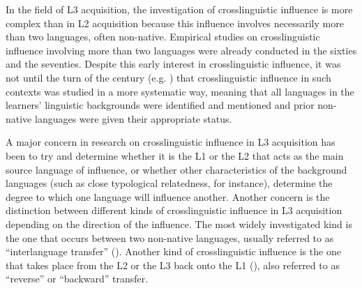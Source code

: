 \documentclass[output=paper]{../langscibook}
\begin{document}
In the field of L3 acquisition, the investigation of crosslinguistic influence is more complex than in L2 acquisition because this influence involves necessarily more than two languages, often non-native. Empirical studies on crosslinguistic influence involving more than two languages were already conducted in the sixties and the seventies. Despite this early interest in crosslinguistic influence, it was not until the turn of the century (e.g. \citealt{WilliamsHammarberg1998, CenozEtAl2001}) that crosslinguistic influence in such contexts was studied in a more systematic way, meaning that all languages in the learners’ linguistic backgrounds were identified and mentioned and prior non-native languages were given their appropriate status.

A major concern in research on crosslinguistic influence in L3 acquisition has been to try and determine whether it is the L1 or the L2 that acts as the main source language of influence, or whether other characteristics of the background languages (such as close typological relatedness, for instance), determine the degree to which one language will influence another. Another concern is the distinction between different kinds of crosslinguistic influence in L3 acquisition depending on the direction of the influence. The most widely investigated kind is the one that occurs between two non-native languages, usually referred to as ``interlanguage transfer'' (\citealt{DeAngelisSelinker2001}). Another kind of crosslinguistic influence is the one that takes place from the L2 or the L3 back onto the L1 (\citealt{KecskesPapp2000}), also referred to as “reverse” or “backward” transfer.
\end{document}
